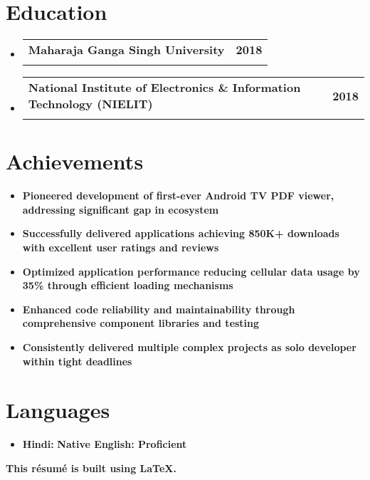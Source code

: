 \documentclass[letterpaper,11pt]{article}
\makeatletter
\newcommand{\resumeItem}[1]{\item\small{\bfseries\color{textblack}#1}\vspace{-2pt}}
\newcommand{\resumeSubheading}[4]{
  \item\small{
    \begin{tabular*}{0.97\textwidth}[t]{l@{\extracolsep{\fill}}r}
      \textbf{\large\color{headingblack}#1} & \textbf{\color{textblack}#2} \\
      \textbf{\color{textblack}\textit{#3}} & \textbf{\color{textblack}\textit{#4}} \\
    \end{tabular*}\vspace{-7pt}
  }
}
\renewcommand{\textbf}[1]{{\bfseries\color{headingblack}#1}}
\renewcommand{\textit}[1]{{\itshape\bfseries\color{textblack}#1}}
\makeatother
\begin{document}
\section{Education}
\nopagebreak
\begin{itemize}[leftmargin=*]
    \resumeSubheading
        {Maharaja Ganga Singh University}{2018}
        {Bachelor of Science (Physics, Chemistry, Mathematics)}{Bikaner}
    
    \resumeSubheading
        {National Institute of Electronics \& Information Technology (NIELIT)}{2018}
        {O Level Certification (Computer Software Technology)}{Grade: B}
\end{itemize}

\vspace{1mm}

\section{Achievements}
\nopagebreak
\begin{itemize}[leftmargin=*]
    \resumeItem{Pioneered development of \textbf{first-ever Android TV PDF viewer}, addressing significant gap in ecosystem}
    \resumeItem{Successfully delivered applications achieving \textbf{850K+ downloads} with excellent user ratings and reviews}
    \resumeItem{Optimized application performance reducing cellular data usage by \textbf{35\%} through efficient loading mechanisms}
    \resumeItem{Enhanced code reliability and maintainability through comprehensive component libraries and testing}
    \resumeItem{Consistently delivered multiple complex projects as solo developer within tight deadlines}
\end{itemize}

\vspace{1mm}

\section{Languages}
\nopagebreak
\begin{itemize}[leftmargin=*]
    \item \textbf{Hindi:} \bfseries\color{textblack}Native \hfill \textbf{English:} \bfseries\color{textblack}Proficient
\end{itemize}

\vfill
\begin{center}
{\small \color{black} \bfseries This résumé is built using \LaTeX.}
\end{center}
\end{document}
